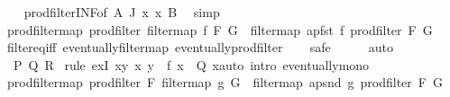 \begin{isabellebody}
%
\isadelimproof
\ \ %
\endisadelimproof
%
\isatagproof
{}\isamarkupfalse%
\ prod{\isacharunderscore}{\kern0pt}filter{\isacharunderscore}{\kern0pt}INF{\isacharbrackleft}{\kern0pt}of\ {\isachardoublequoteopen}{\isacharbraceleft}{\kern0pt}A{\isacharbraceright}{\kern0pt}{\isachardoublequoteclose}\ J\ {\isachardoublequoteopen}{\isasymlambda}x{\isachardot}{\kern0pt}\ x{\isachardoublequoteclose}\ B{\isacharbrackright}{\kern0pt}\ \isamarkupfalse%
\ simp%
\endisatagproof
{\isafoldproof}%
%
\isadelimproof
\isanewline
%
\endisadelimproof
\isanewline
{}\isamarkupfalse%
\ prod{\isacharunderscore}{\kern0pt}filtermap{}{\isacharcolon}{\kern0pt}\ {\isachardoublequoteopen}prod{\isacharunderscore}{\kern0pt}filter\ {\isacharparenleft}{\kern0pt}filtermap\ f\ F{\isacharparenright}{\kern0pt}\ G\ {\isacharequal}{\kern0pt}\ filtermap\ {\isacharparenleft}{\kern0pt}apfst\ f{\isacharparenright}{\kern0pt}\ {\isacharparenleft}{\kern0pt}prod{\isacharunderscore}{\kern0pt}filter\ F\ G{\isacharparenright}{\kern0pt}{\isachardoublequoteclose}\isanewline
%
\isadelimproof
\ \ %
\endisadelimproof
%
\isatagproof
{}\isamarkupfalse%
\ filter{\isacharunderscore}{\kern0pt}eq{\isacharunderscore}{\kern0pt}iff\ eventually{\isacharunderscore}{\kern0pt}filtermap\ eventually{\isacharunderscore}{\kern0pt}prod{\isacharunderscore}{\kern0pt}filter\isanewline
\ \ \isamarkupfalse%
\ safe\isanewline
\ \ \isamarkupfalse%
\ \isamarkupfalse%
\ auto\isanewline
\ \ \isamarkupfalse%
\ \ P\ Q\ R\ \isamarkupfalse%
{\isacharparenleft}{\kern0pt}rule\ exI{\isacharbrackleft}{\kern0pt}\ x{\isacharequal}{\kern0pt}{\isachardoublequoteopen}{\isasymlambda}y{\isachardot}{\kern0pt}\ {\isasymexists}x{\isachardot}{\kern0pt}\ y\ {\isacharequal}{\kern0pt}\ f\ x\ {\isasymand}\ Q\ x{\isachardoublequoteclose}{\isacharbrackright}{\kern0pt}{\isacharparenright}{\kern0pt}{\isacharparenleft}{\kern0pt}auto\ intro{\isacharcolon}{\kern0pt}\ eventually{\isacharunderscore}{\kern0pt}mono{\isacharparenright}{\kern0pt}\isanewline
\ \ \isamarkupfalse%
%
\endisatagproof
{\isafoldproof}%
%
\isadelimproof
\isanewline
%
\endisadelimproof
\isanewline
{}\isamarkupfalse%
\ prod{\isacharunderscore}{\kern0pt}filtermap{}{\isacharcolon}{\kern0pt}\ {\isachardoublequoteopen}prod{\isacharunderscore}{\kern0pt}filter\ F\ {\isacharparenleft}{\kern0pt}filtermap\ g\ G{\isacharparenright}{\kern0pt}\ {\isacharequal}{\kern0pt}\ filtermap\ {\isacharparenleft}{\kern0pt}apsnd\ g{\isacharparenright}{\kern0pt}\ {\isacharparenleft}{\kern0pt}prod{\isacharunderscore}{\kern0pt}filter\ F\ G{\isacharparenright}{\kern0pt}{\isachardoublequoteclose}\isanewline

\end{isabellebody}

